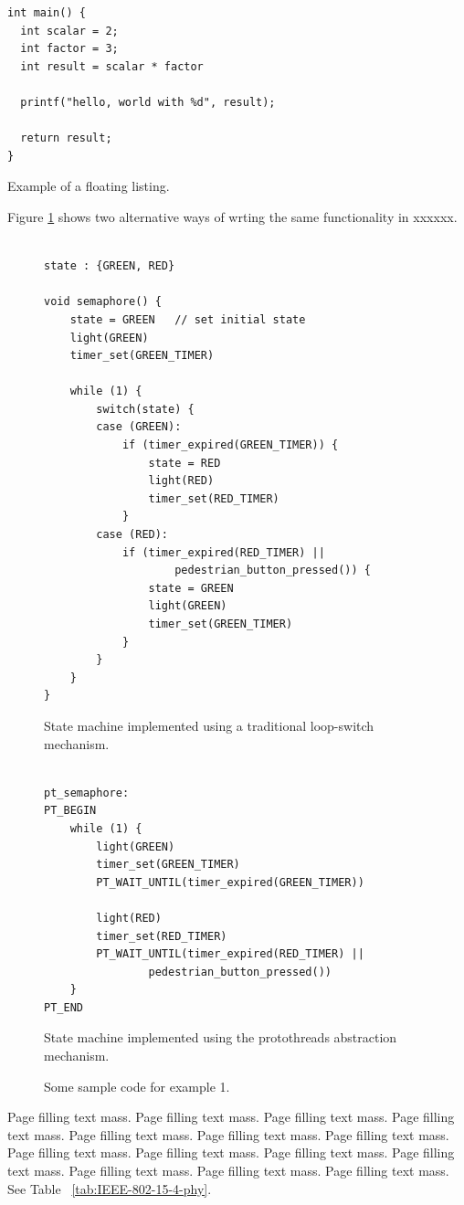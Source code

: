 \documentclass[12pt,a4paper,twoside,openright]{book}
\begin{document}
\begin{listing}[H]
\begin{verbatim}
int main() {
  int scalar = 2;
  int factor = 3;
  int result = scalar * factor

  printf("hello, world with %d", result);
 
  return result;
}
\end{verbatim}
\caption{Example of a floating listing.}
\label{lst:example}
\end{listing}

Figure \ref{fig:code2} shows two alternative ways of wrting the same
functionality in xxxxxx.

\begin{figure}[h!]
\label{fig:code2}
\begin{minipage}[b]{0.44\linewidth}
\begin{lstlisting}

state : {GREEN, RED}

void semaphore() {
	state = GREEN 	// set initial state
	light(GREEN)
	timer_set(GREEN_TIMER)
	
	while (1) {
		switch(state) {
		case (GREEN): 
			if (timer_expired(GREEN_TIMER)) {
				state = RED
				light(RED)
				timer_set(RED_TIMER)
			}
		case (RED):
			if (timer_expired(RED_TIMER) || 
					pedestrian_button_pressed()) {
				state = GREEN
				light(GREEN)
				timer_set(GREEN_TIMER)
			}
		}
	}
}
\end{lstlisting}
State machine implemented using a traditional loop-switch mechanism.
\end{minipage}
\hspace{0.3cm}
\begin{minipage}[b]{0.52\linewidth}
\begin{lstlisting}

pt_semaphore:
PT_BEGIN
	while (1) {
		light(GREEN)
		timer_set(GREEN_TIMER)
		PT_WAIT_UNTIL(timer_expired(GREEN_TIMER))
		
		light(RED)
		timer_set(RED_TIMER)
		PT_WAIT_UNTIL(timer_expired(RED_TIMER) || 
				pedestrian_button_pressed())
	}
PT_END

\end{lstlisting}
State machine implemented using the protothreads abstraction mechanism.
\end{minipage}
\caption[Code example 1]{Some sample code for example 1.}
\end{figure}

Page filling text mass. Page filling text mass. Page filling text mass. Page
filling text mass. Page filling text mass. Page filling text mass. Page
filling text mass. Page filling text mass. Page filling text mass. Page
filling text mass. Page filling text mass. Page filling text mass. Page
filling text mass. Page filling text mass.  See Table
~\ref{tab:IEEE-802-15-4-phy}.
\end{document}
